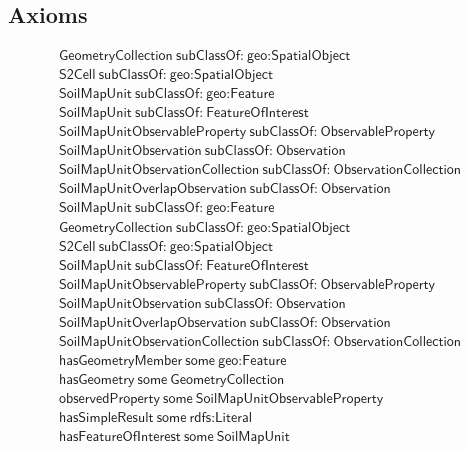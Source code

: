 \subsection{Axioms}
\begin{align}
  \textsf{GeometryCollection}~\textsf{subClassOf:}~\textsf{geo:SpatialObject}\\
  \textsf{S2Cell}~\textsf{subClassOf:}~\textsf{geo:SpatialObject}\\
  \textsf{SoilMapUnit}~\textsf{subClassOf:}~\textsf{geo:Feature}\\
  \textsf{SoilMapUnit}~\textsf{subClassOf:}~\textsf{FeatureOfInterest}\\
  \textsf{SoilMapUnitObservableProperty}~\textsf{subClassOf:}~\textsf{ObservableProperty}\\
  \textsf{SoilMapUnitObservation}~\textsf{subClassOf:}~\textsf{Observation}\\
  \textsf{SoilMapUnitObservationCollection}~\textsf{subClassOf:}~\textsf{ObservationCollection}\\
  \textsf{SoilMapUnitOverlapObservation}~\textsf{subClassOf:}~\textsf{Observation}\\
  \textsf{SoilMapUnit}~\textsf{subClassOf:}~\textsf{geo:Feature}\\
  \textsf{GeometryCollection}~\textsf{subClassOf:}~\textsf{geo:SpatialObject}\\
  \textsf{S2Cell}~\textsf{subClassOf:}~\textsf{geo:SpatialObject}\\
  \textsf{SoilMapUnit}~\textsf{subClassOf:}~\textsf{FeatureOfInterest}\\
  \textsf{SoilMapUnitObservableProperty}~\textsf{subClassOf:}~\textsf{ObservableProperty}\\
  \textsf{SoilMapUnitObservation}~\textsf{subClassOf:}~\textsf{Observation}\\
  \textsf{SoilMapUnitOverlapObservation}~\textsf{subClassOf:}~\textsf{Observation}\\
  \textsf{SoilMapUnitObservationCollection}~\textsf{subClassOf:}~\textsf{ObservationCollection}\\
  \textsf{hasGeometryMember}~\textsf{some}~\textsf{geo:Feature}\\
  \textsf{hasGeometry}~\textsf{some}~\textsf{GeometryCollection}\\
  \textsf{observedProperty}~\textsf{some}~\textsf{SoilMapUnitObservableProperty}\\
  \textsf{hasSimpleResult}~\textsf{some}~\textsf{rdfs:Literal}\\
  \textsf{hasFeatureOfInterest}~\textsf{some}~\textsf{SoilMapUnit}\\

\end{align}
